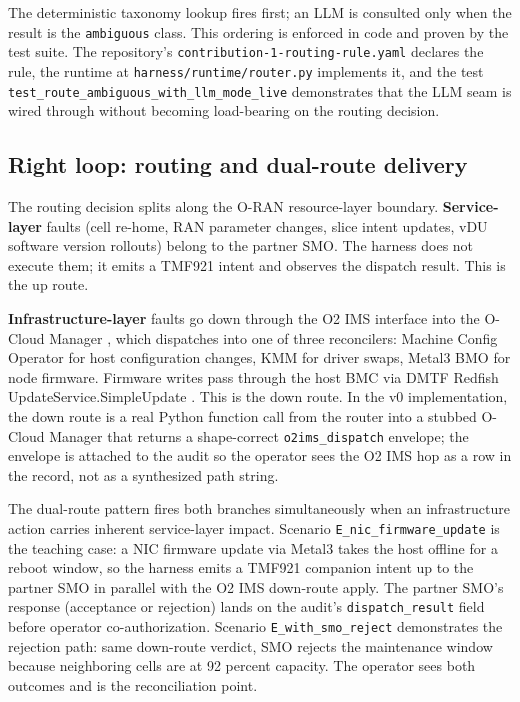 \documentclass[twocolumn,10pt,a4paper]{article}
\begin{document}
The deterministic taxonomy lookup fires first; an LLM is consulted only when the result is the \texttt{ambiguous} class. This ordering is enforced in code and proven by the test suite. The repository's \texttt{contribution-1-routing-rule.yaml} declares the rule, the runtime at \texttt{harness/runtime/router.py} implements it, and the test \texttt{test\_route\_ambiguous\_with\_llm\_mode\_live} demonstrates that the LLM seam is wired through without becoming load-bearing on the routing decision.

\subsection{Right loop: routing and dual-route delivery}

The routing decision splits along the O-RAN resource-layer boundary. \textbf{Service-layer} faults (cell re-home, RAN parameter changes, slice intent updates, vDU software version rollouts) belong to the partner SMO. The harness does not execute them; it emits a TMF921 intent \cite{tmf921} and observes the dispatch result. This is the up route.

\textbf{Infrastructure-layer} faults go down through the O2 IMS interface \cite{oran_o2_ganp,oran_o2_ims} into the O-Cloud Manager \cite{oran_o2ims_ocm}, which dispatches into one of three reconcilers: Machine Config Operator \cite{openshift_mco} for host configuration changes, KMM \cite{kmm_operator} for driver swaps, Metal3 BMO \cite{metal3_bmo} for node firmware. Firmware writes pass through the host BMC via DMTF Redfish UpdateService.SimpleUpdate \cite{dmtf_redfish}. This is the down route. In the v0 implementation, the down route is a real Python function call from the router into a stubbed O-Cloud Manager that returns a shape-correct \texttt{o2ims\_dispatch} envelope; the envelope is attached to the audit so the operator sees the O2 IMS hop as a row in the record, not as a synthesized path string.

The dual-route pattern fires both branches simultaneously when an infrastructure action carries inherent service-layer impact. Scenario \texttt{E\_nic\_firmware\_update} is the teaching case: a NIC firmware update via Metal3 takes the host offline for a reboot window, so the harness emits a TMF921 companion intent up to the partner SMO in parallel with the O2 IMS down-route apply. The partner SMO's response (acceptance or rejection) lands on the audit's \texttt{dispatch\_result} field before operator co-authorization. Scenario \texttt{E\_with\_smo\_reject} demonstrates the rejection path: same down-route verdict, SMO rejects the maintenance window because neighboring cells are at 92 percent capacity. The operator sees both outcomes and is the reconciliation point.
\end{document}
